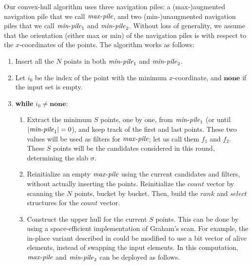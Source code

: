\documentclass[final,onetabnum,onefignum,onethmnum]{siamltex}
\newcommand{\Rank}{\mbox{$\mathit{rank}$}}
\newcommand{\Select}{\mbox{$\mathit{select}$}}
\newcommand{\MinOne}{\mbox{$\mathit{min}\mbox{\rm -}\mathit{pile}_1$}}
\newcommand{\MinTwo}{\mbox{$\mathit{min}\mbox{\rm -}\mathit{pile}_2$}}
\newcommand{\MaxPile}{\mbox{$\mathit{max}\mbox{\rm -}\mathit{pile}$}}
\begin{document}
Our convex-hull algorithm uses three navigation piles: a
(max-)augmented navigation pile that we call \MaxPile{}, and two
(min-)unaugmented navigation piles that we call \MinOne{} and
\MinTwo{}.  
Without loss of generality, we assume that the orientation (either max or min) 
of the navigation piles is with respect to the $x$-coordinates of the
points. The algorithm works as follows:

\begin{enumerate}

\item
Insert all the $N$ points in both \MinOne{} and \MinTwo{}.
\item
Let $i_0$ be the index of the point with the minimum $x$-coordinate, and $\mathbf{none}$ if the input set is empty.
\item
\textbf{while} $i_0 \neq \mathbf{none}$:

\begin{enumerate}

\item Extract the minimum $S$ points, one by one, from \MinOne{} (or
  until $|\MinOne{}| = 0$), and keep track of the first and last points. 
  These two values will be used as filters for \MaxPile{}; let us call them 
  $f_1$ and $f_2$. These $S$ points will be the candidates considered in this round, 
  determining the slab $\sigma$.

\item Reinitialize an empty \MaxPile{} using the current candidates and filters, 
  without actually inserting the points. Reinitialize the
  $\mathit{count}$ vector by scanning the $N$ points, bucket by
  bucket. Then, build the \Rank{} and \Select{} structures for the
  $\mathit{count}$ vector.

\item
\label{critical-piece}
 Construct the upper hull for the current $S$ points. This can be
  done by using a space-efficient implementation of Graham's scan. For
  example, the in-place variant described in \cite{BIKMMT04} could be
  modified to use a bit vector of alive elements, instead of swapping
  the input elements. In this computation, \MaxPile{} and \MinTwo{}
  can be deployed as follows.


\end{enumerate}
\end{enumerate}
\end{document}

